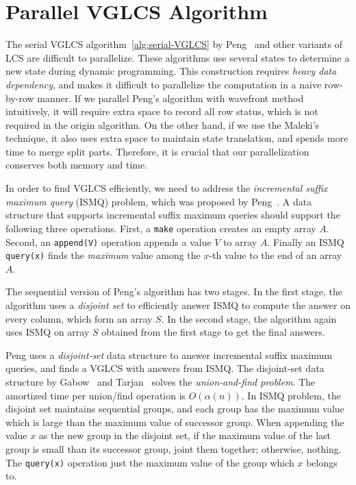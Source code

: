 \section{Parallel VGLCS Algorithm} %
\label{sec:parallelVGLCS}



The serial VGLCS algorithm~\ref{alg:serial-VGLCS} by
Peng~\cite{Peng2011TheLC} and other variants of LCS are difficult to
parallelize.  These algorithms use several states to determine a new
state during dynamic programming.  This construction requires {\em
  heavy data dependency}, and makes it difficult to parallelize the
computation in a naive row-by-row manner.  If we parallel Peng's
algorithm with wavefront method intuitively, it will require extra
space to record all row status, which is not required in the origin
algorithm.  On the other hand, if we use the
Maleki's~\cite{Maleki2016EfficientPU} technique, it also uses extra
space to maintain state translation, and spends more time to merge
split parts.  Therefore, it is crucial that our parallelization
conserves both memory and time.

In order to find VGLCS efficiently, we need to address the {\em
  incremental suffix maximum query} (ISMQ) problem, which was
proposed by Peng~\cite{Peng2011TheLC}.  A data structure that supports
incremental suffix maximum queries should support the following three
operations.  First, a {\tt make} operation creates an empty array $A$.
Second, an {\tt append(V)} operation appends a value $V$ to array $A$.
Finally an ISMQ {\tt query(x)} finds the {\em maximum} value among the
$x$-th value to the end of an array $A$.

The sequential version of Peng's algorithm has two stages.  In the
first stage, the algorithm uses a {\em disjoint set} to efficiently
answer ISMQ to compute the answer on every column, which form an array
$S$.  In the second stage, the algorithm again uses ISMQ on array $S$
obtained from the first stage to get the final answers.

Peng uses a {\em disjoint-set} data structure to answer incremental
suffix maximum queries, and finds a VGLCS with answers from ISMQ. The
disjoint-set data structure by Gabow~\cite{Gabow1983ALA} and
Tarjan~\cite{Tarjan1975EfficiencyOA} solves the {\em union-and-find
problem}.  The amortized time per union/find operation is
$O(\alpha(n))$.  In ISMQ problem, the disjoint set maintains sequential
groups, and each group has the maximum value which is large than the
maximum value of successor group.  When appending the value $x$ as the
new group in the disjoint set, if the maximum value of the last group is
small than its successor group, joint them together; otherwise, nothing.
The {\tt query(x)} operation just the maximum value of the group which
$x$ belongs to.

